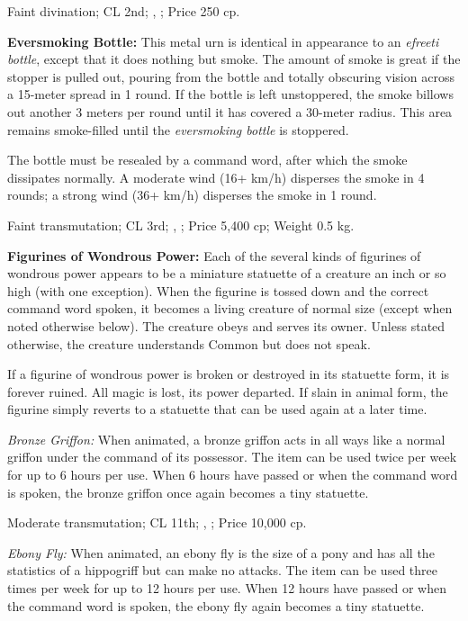 Faint divination; CL 2nd; , ; Price 250 cp.



\textbf{Eversmoking Bottle:} This metal urn is identical in appearance to an \emph{efreeti bottle}, except that it does nothing but smoke. The amount of smoke is great if the stopper is pulled out, pouring from the bottle and totally obscuring vision across a 15-meter spread in 1 round. If the bottle is left unstoppered, the smoke billows out another 3 meters per round until it has covered a 30-meter radius. This area remains smoke-filled until the \emph{eversmoking bottle} is stoppered.

The bottle must be resealed by a command word, after which the smoke dissipates normally. A moderate wind (16+ km/h) disperses the smoke in 4 rounds; a strong wind (36+ km/h) disperses the smoke in 1 round.

Faint transmutation; CL 3rd; , ; Price 5,400 cp; Weight 0.5 kg.



\textbf{Figurines of Wondrous Power:} Each of the several kinds of figurines of wondrous power appears to be a miniature statuette of a creature an inch or so high (with one exception). When the figurine is tossed down and the correct command word spoken, it becomes a living creature of normal size (except when noted otherwise below). The creature obeys and serves its owner. Unless stated otherwise, the creature understands Common but does not speak.

If a figurine of wondrous power is broken or destroyed in its statuette form, it is forever ruined. All magic is lost, its power departed. If slain in animal form, the figurine simply reverts to a statuette that can be used again at a later time.

\textit{Bronze Griffon:} When animated, a bronze griffon acts in all ways like a normal griffon under the command of its possessor. The item can be used twice per week for up to 6 hours per use. When 6 hours have passed or when the command word is spoken, the bronze griffon once again becomes a tiny statuette.

Moderate transmutation; CL 11th; , ; Price 10,000 cp.

\textit{Ebony Fly:} When animated, an ebony fly is the size of a pony and has all the statistics of a hippogriff but can make no attacks. The item can be used three times per week for up to 12 hours per use. When 12 hours have passed or when the command word is spoken, the ebony fly again becomes a tiny statuette.

